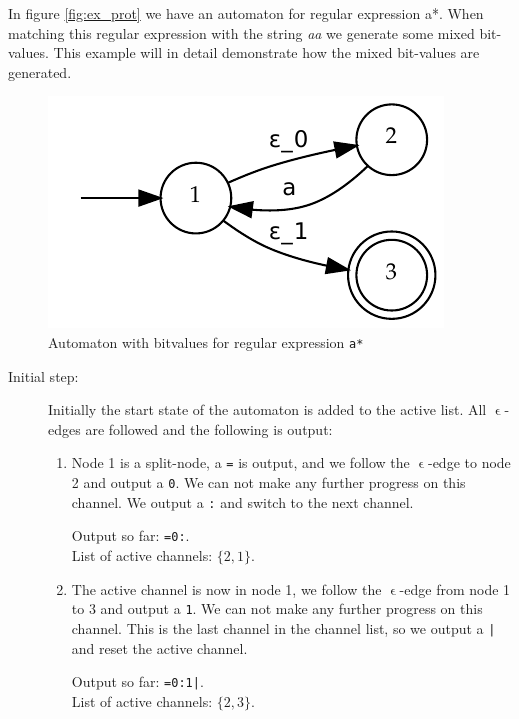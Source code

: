 \begin{example}[Protocol]
  In figure \vref{fig:ex_prot} we have an automaton for regular
  expression \textsf{a*}. When matching this regular expression with
  the string \textsl{aa} we generate some mixed bit-values. This
  example will in detail demonstrate how the mixed bit-values are
  generated.
  \begin{figure}
    \centering
    \includegraphics{matching/example_protocol.pdf}
    \caption{Automaton with bitvalues for regular expression
      \texttt{a*}}
    \label{fig:ex_prot}
  \end{figure}
  
  \begin{description}
  
  \item[Initial step:] Initially the start state of the automaton is
    added to the active list. All $\upvarepsilon$-edges are followed
    and the following is output:
    \begin{enumerate}
    \item Node 1 is a split-node, a \texttt{=} is output, and we
      follow the $\upvarepsilon$-edge to node 2 and output a
      \texttt{0}. We can not make any further progress on this
      channel. We output a \texttt{:} and switch to the next channel.

      Output so far: \texttt{=0:}. \\
      List of active channels: $\{2, 1\}$.
    \item The active channel is now in node 1, we follow the
      $\upvarepsilon$-edge from node 1 to 3 and output a
      \texttt{1}. We can not make any further progress on this
      channel. This is the last channel in the channel list, so we
      output a \texttt{|} and reset the active channel.

      Output so far: \texttt{=0:1|}.\\
      List of active channels: $\{2, 3\}$.
    \end{enumerate}


\end{description}
\end{example}
